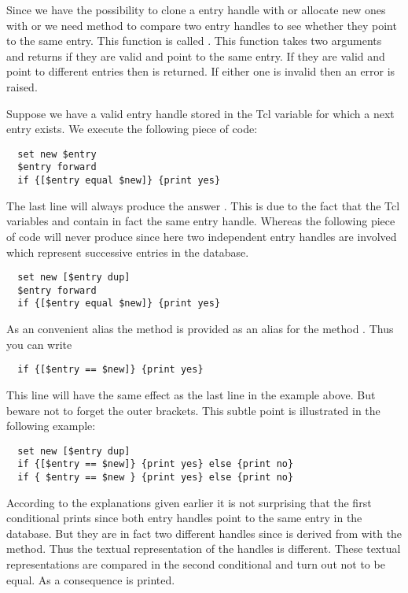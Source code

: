 Since we have the possibility to clone a entry handle with
 or allocate new ones with  or
 we need method to compare two entry handles to
see whether they point to the same entry. This function is called
. This function takes two arguments and returns
 if they are valid and point to the same entry. If they are
valid and point to different entries then  is returned. If
either one is invalid then an error is raised.

Suppose we have a valid entry handle stored in the Tcl variable
 for which a next entry exists. We execute the following
piece of code:
\begin{verbatim}
  set new $entry
  $entry forward
  if {[$entry equal $new]} {print yes}
\end{verbatim}
The last line will always produce the answer . This is due
to the fact that the Tcl variables  and  contain in
fact the same entry handle. Whereas the following piece of code will
never produce  since here two independent entry handles are
involved which represent successive entries in the database. 
\begin{verbatim}
  set new [$entry dup]
  $entry forward
  if {[$entry equal $new]} {print yes}
\end{verbatim}

As an convenient alias the method  is provided as an
alias for the method . Thus you can write
\begin{verbatim}
  if {[$entry == $new]} {print yes}
\end{verbatim}
This line will have the same effect as the last line in the example
above. But beware not to forget the outer brackets. This subtle point
is illustrated in the following example:
\begin{verbatim}
  set new [$entry dup]
  if {[$entry == $new]} {print yes} else {print no}
  if { $entry == $new } {print yes} else {print no}
\end{verbatim}%
According to the explanations given earlier it is not surprising that
the first conditional prints  since both entry handles
point to the same entry in the database. But they are in fact two
different handles since  is derived from  with the
 method. Thus the textual representation of the handles is
different. These textual representations are compared in the second
conditional and turn out not to be equal. As a consequence 
is printed.

